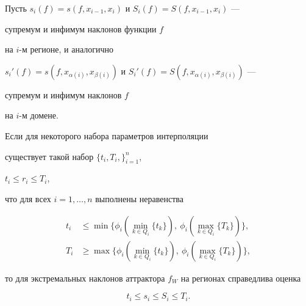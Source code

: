 Пусть $s_i (f) = s (f,x_{i-1} , x_i) $ и $S_i (f) = S (f,x_{i-1} , x_i) $ ---


супремум и инфимум наклонов функции $ f $


на $i$-м регионе, и аналогично


$s_i' (f) = s (f,x_{\alpha(i)} , x_{\beta(i)}) $ и $ S_i' (f) =


S (f,x_{\alpha(i)} , x_{\beta(i)}) $ ---


супремум и инфимум наклонов $f$


на $i$-м домене.





\begin{lem} \label{lem_lip}


Если для некоторого набора параметров интерполяции


существует такой набор $ \{ t_i, T_i, \}_{i=1}^n $,


$t_i \le r_i \le T_i$,


что для всех $i=1, \dotsc, n $ выполнены неравенства


\begin{equation} \label{glavn_usl}


\begin{split}


t_i &\le \min \{ \phi_i (\min_{k \in Q_i} \{ t_k \}),


\ \phi_i (\max_{k \in Q_i} \{ T_k \}) \}, \\


T_i &\ge \max \{ \phi_i (\min_{k \in Q_i} \{ t_k \}),


\ \phi_i (\max_{k \in Q_i} \{ T_k \}) \},


\end{split}


\end{equation}


то для экстремальных наклонов аттрактора $f_W$ на регионах справедлива оценка


$$


t_i \le s_i \le S_i \le T_i .


$$


\end{lem}





